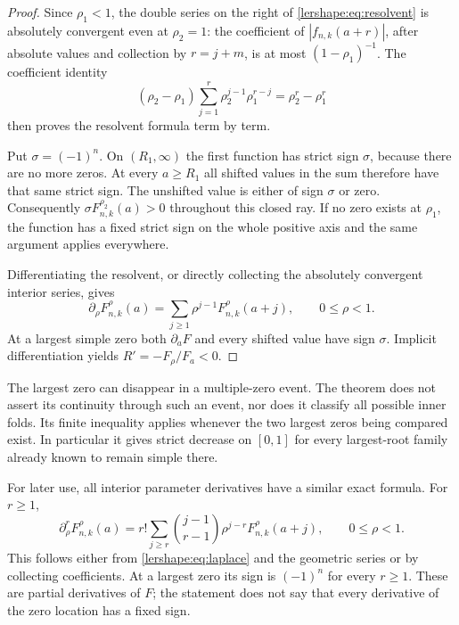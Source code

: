 \begin{proof}
Since $\rho_1<1$, the double series on the right of
\eqref{lershape:eq:resolvent} is absolutely convergent even at
$\rho_2=1$: the coefficient of $|f_{n,k}(a+r)|$, after absolute values
and collection by $r=j+m$, is at most $(1-\rho_1)^{-1}$.
The coefficient identity
\[
 (\rho_2-\rho_1)\sum_{j=1}^r\rho_2^{j-1}\rho_1^{r-j}
 =\rho_2^r-\rho_1^r
\]
then proves the resolvent formula term by term.

Put $\sigma=(-1)^n$. On $(R_1,\infty)$ the first function has
strict sign $\sigma$, because there are no more zeros. At every
$a\geq R_1$ all shifted values in the sum therefore have that same
strict sign. The unshifted value is either of sign $\sigma$ or zero.
Consequently $\sigma F_{n,k}^{\rho_2}(a)>0$ throughout this closed
ray. If no zero exists at $\rho_1$, the function has a fixed strict
sign on the whole positive axis and the same argument applies everywhere.

Differentiating the resolvent, or directly collecting the absolutely
convergent interior series, gives
\begin{equation}\label{lershape:eq:parameter-resolvent}
 \partial_\rho F_{n,k}^{\rho}(a)
 =\sum_{j\geq1}\rho^{j-1}F_{n,k}^{\rho}(a+j),\qquad 0\leq\rho<1.
\end{equation}
At a largest simple zero both $\partial_a F$ and every shifted value
have sign $\sigma$. Implicit differentiation yields
$R'=-F_\rho/F_a<0$.
\end{proof}

\begin{remark}
The largest zero can disappear in a multiple-zero event. The theorem
does not assert its continuity through such an event, nor does it
classify all possible inner folds. Its finite inequality applies
whenever the two largest zeros being compared exist. In particular it
gives strict decrease on $[0,1]$ for every largest-root family already
known to remain simple there.
\end{remark}

For later use, all interior parameter derivatives have a similar exact
formula. For $r\geq1$,
\begin{equation}\label{lershape:eq:higher-parameter}
 \partial_\rho^rF_{n,k}^{\rho}(a)
 =r!\sum_{j\geq r}\binom{j-1}{r-1}\rho^{j-r}
 F_{n,k}^{\rho}(a+j),\qquad 0\leq\rho<1.
\end{equation}
This follows either from \eqref{lershape:eq:laplace} and the geometric
series or by collecting coefficients. At a largest zero its sign is
$(-1)^n$ for every $r\geq1$. These are partial derivatives of $F$;
the statement does not say that every derivative of the zero location
has a fixed sign.

